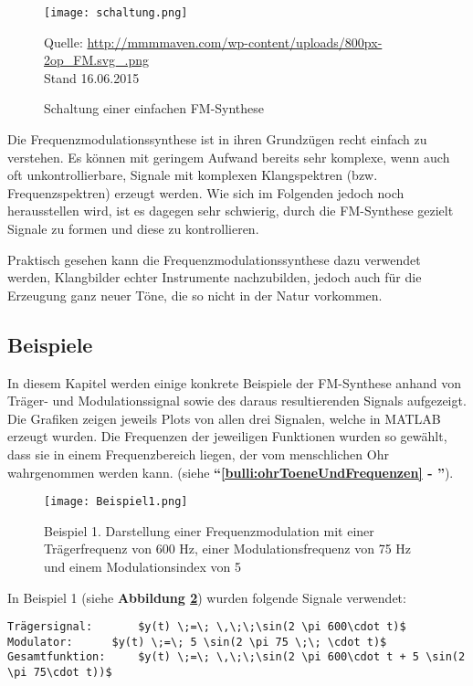 \begin{figure} [ht]
\centering
  \texttt{[image: schaltung.png]}
\caption{Schaltung einer einfachen FM-Synthese}
\label{fig:schaltung}
Quelle: \url{http://mmmmaven.com/wp-content/uploads/800px-2op_FM.svg_.png} 
\\Stand 16.06.2015
\end{figure}

Die Frequenzmodulationssynthese ist in ihren Grundzügen recht einfach zu verstehen. Es können mit geringem Aufwand bereits sehr komplexe, wenn auch oft unkontrollierbare, Signale mit komplexen Klangspektren (bzw. Frequenzspektren) erzeugt werden. Wie sich im Folgenden jedoch noch herausstellen wird, ist es dagegen sehr schwierig, durch die FM-Synthese gezielt Signale zu formen und diese zu kontrollieren.

Praktisch gesehen kann die Frequenzmodulationssynthese dazu verwendet werden, Klangbilder echter Instrumente nachzubilden, jedoch auch für die Erzeugung ganz neuer Töne, die so nicht in der Natur vorkommen.

\FloatBarrier
\subsection{Beispiele}
In diesem Kapitel werden einige konkrete Beispiele der FM-Synthese anhand von Träger- und Modulationssignal sowie des daraus resultierenden Signals aufgezeigt. Die Grafiken zeigen jeweils Plots von allen drei Signalen, welche in MATLAB erzeugt wurden.
Die Frequenzen der jeweiligen Funktionen wurden so gewählt, dass sie in einem Frequenzbereich liegen, der vom menschlichen Ohr wahrgenommen werden kann. (siehe \textbf{``\ref{bulli:ohrToeneUndFrequenzen} - ''}).

\begin{figure} [ht]
\centering
  \texttt{[image: Beispiel1.png]}
\caption{Beispiel 1. Darstellung einer Frequenzmodulation mit einer Trägerfrequenz von 600 Hz, einer Modulationsfrequenz von 75 Hz und einem Modulationsindex von 5 }
\label{fig:beispiel1}
\end{figure}

In Beispiel 1 (siehe \textbf{Abbildung \ref{fig:beispiel1}})  wurden folgende Signale verwendet:

\begin{lstlisting}[mathescape]
Trägersignal: 		$y(t) \;=\; \,\;\;\sin(2 \pi 600\cdot t)$
Modulator:		$y(t) \;=\; 5 \sin(2 \pi 75 \;\; \cdot t)$
Gesamtfunktion: 	$y(t) \;=\; \,\;\;\sin(2 \pi 600\cdot t + 5 \sin(2 \pi 75\cdot t))$
\end{lstlisting}


